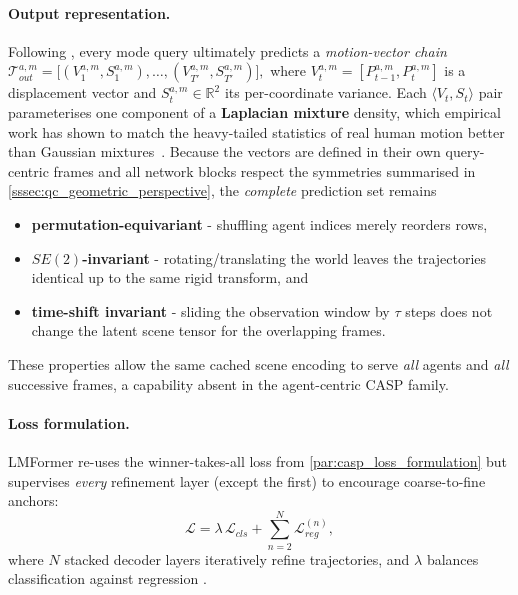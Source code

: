 \paragraph{Output representation.}
Following \cite{lmformerYadav2025}, every mode query ultimately predicts a
\emph{motion-vector chain}
\(
\mathcal{T}_{out}^{a,m}
  = \bigl[(V_1^{a,m},S_1^{a,m}),\dots,(V_{T'}^{a,m},S_{T'}^{a,m})\bigr],
\)
where \(V_t^{a,m}=[P_{t-1}^{a,m},P_t^{a,m}]\) is a displacement vector and
\(S_t^{a,m}\in\mathbb{R}^{2}\) its per-coordinate variance.
Each \(\langle V_t,S_t\rangle\) pair parameterises one component of a
\textbf{Laplacian mixture} density, which empirical work
has shown to match the heavy-tailed statistics of real human motion better than
Gaussian mixtures~\cite{zhou2022hivt,caspformerYadav2024}.  Because the
vectors are defined in their own query-centric frames and all network blocks
respect the symmetries summarised in \autoref{sssec:qc_geometric_perspective},
the \emph{complete} prediction set remains

\begin{itemize}[nosep,leftmargin=1.5em]
\item \textbf{permutation-equivariant} - shuffling agent indices merely reorders rows,
\item \textbf{\(SE(2)\)-invariant} - rotating/translating the world leaves the trajectories identical up to the same rigid transform, and
\item \textbf{time-shift invariant} - sliding the observation window by \(\tau\) steps does not change the latent scene tensor for the overlapping frames.
\end{itemize}

These properties allow the same cached scene encoding to serve \emph{all}
agents and \emph{all} successive frames, a capability absent in the
agent-centric CASP family.

\paragraph{Loss formulation.}
LMFormer re-uses the winner-takes-all loss from
\autoref{par:casp_loss_formulation} but supervises \emph{every} refinement
layer (except the first) to encourage coarse-to-fine anchors:
\begin{equation}
  \mathcal{L}
  = \lambda\,\mathcal{L}_{cls}
    + \sum_{n=2}^{N}\mathcal{L}_{reg}^{(n)},
  \label{eq:lm_loss}
\end{equation}
where \(N\) stacked decoder layers iteratively refine trajectories, and
\(\lambda\) balances classification against regression
\cite{lmformerYadav2025}.

